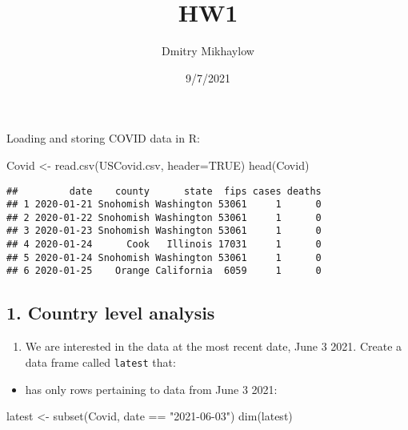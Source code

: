 \documentclass[
]{article}
\title{HW1}
\author{Dmitry Mikhaylow}
\date{9/7/2021}
\newenvironment{Shaded}{\begin{snugshade}}{\end{snugshade}}
\newcommand{\AttributeTok}[1]{\textcolor[rgb]{0.77,0.63,0.00}{#1}}
\newcommand{\ConstantTok}[1]{\textcolor[rgb]{0.00,0.00,0.00}{#1}}
\newcommand{\FunctionTok}[1]{\textcolor[rgb]{0.00,0.00,0.00}{#1}}
\newcommand{\NormalTok}[1]{#1}
\newcommand{\OtherTok}[1]{\textcolor[rgb]{0.56,0.35,0.01}{#1}}
\newcommand{\SpecialCharTok}[1]{\textcolor[rgb]{0.00,0.00,0.00}{#1}}
\newcommand{\StringTok}[1]{\textcolor[rgb]{0.31,0.60,0.02}{#1}}
\providecommand{\tightlist}{%
  \setlength{\itemsep}{0pt}\setlength{\parskip}{0pt}}
\begin{document}
\maketitle

Loading and storing COVID data in R:

\begin{Shaded}
\begin{Highlighting}[]
\NormalTok{Covid }\OtherTok{\textless{}{-}} \FunctionTok{read.csv}\NormalTok{(}\StringTok{\textquotesingle{}USCovid.csv\textquotesingle{}}\NormalTok{, }\AttributeTok{header=}\ConstantTok{TRUE}\NormalTok{)}
\FunctionTok{head}\NormalTok{(Covid)}
\end{Highlighting}
\end{Shaded}

\begin{verbatim}
##         date    county      state  fips cases deaths
## 1 2020-01-21 Snohomish Washington 53061     1      0
## 2 2020-01-22 Snohomish Washington 53061     1      0
## 3 2020-01-23 Snohomish Washington 53061     1      0
## 4 2020-01-24      Cook   Illinois 17031     1      0
## 5 2020-01-24 Snohomish Washington 53061     1      0
## 6 2020-01-25    Orange California  6059     1      0
\end{verbatim}

\hypertarget{country-level-analysis}{%
\subsection{1. Country level analysis}\label{country-level-analysis}}

\begin{enumerate}
\def\labelenumi{\alph{enumi}.}
\tightlist
\item
  We are interested in the data at the most recent date, June 3 2021.
  Create a data frame called \texttt{latest} that:
\end{enumerate}

\begin{itemize}
\tightlist
\item
  has only rows pertaining to data from June 3 2021:
\end{itemize}

\begin{Shaded}
\begin{Highlighting}[]
\NormalTok{latest }\OtherTok{\textless{}{-}} \FunctionTok{subset}\NormalTok{(Covid, date }\SpecialCharTok{==} \StringTok{"2021{-}06{-}03"}\NormalTok{)}
\FunctionTok{dim}\NormalTok{(latest)}
\end{Highlighting}
\end{Shaded}
\end{document}
